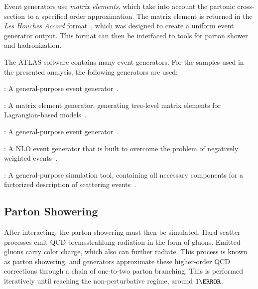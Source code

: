 Event generators use \textit{matrix elements}, which take into account the partonic cross-section to a specified order approximation. The matrix element is returned in the \textit{Les Houches Accord} format~\cite{les-houches}, which was designed to create a uniform event generator output. This format can then be interfaced to tools for parton shower and hadronization.

The ATLAS software contains many event generators. For the samples used in the presented analysis, the following generators are used:

\begin{description}
    \item \HERWIGpp: A general-purpose event generator~\cite{herwigpp}.
    \item \MADGRAPH: A matrix element generator, generating tree-level matrix elements for Lagrangian-based models~\cite{mg5}.
    \item \PYTHIA: A general-purpose event generator~\cite{pythia8.2}.
    \item \POWHEG: A \gls{NLO} event generator that is built to overcome the problem of negatively weighted events~\cite{powheg}. %
    \item \SHERPA: A general-purpose simulation tool, containing all necessary components for a factorized description of scattering events~\cite{sherpa2.2}.
\end{description}


\subsection{Parton Showering}\label{ssec:partonshower} %
After interacting, the parton showering must then be simulated. Hard scatter processes emit \gls{QCD} bremsstrahlung radiation in the form of gluons. Emitted gluons carry color charge, which also can further radiate. This process is known as parton showering, and generators approximate these higher-order \gls{QCD} corrections through a chain of one-to-two parton branching. This is performed iteratively until reaching the non-perturbative regime, around $\unit{1}{\GeV}$.


